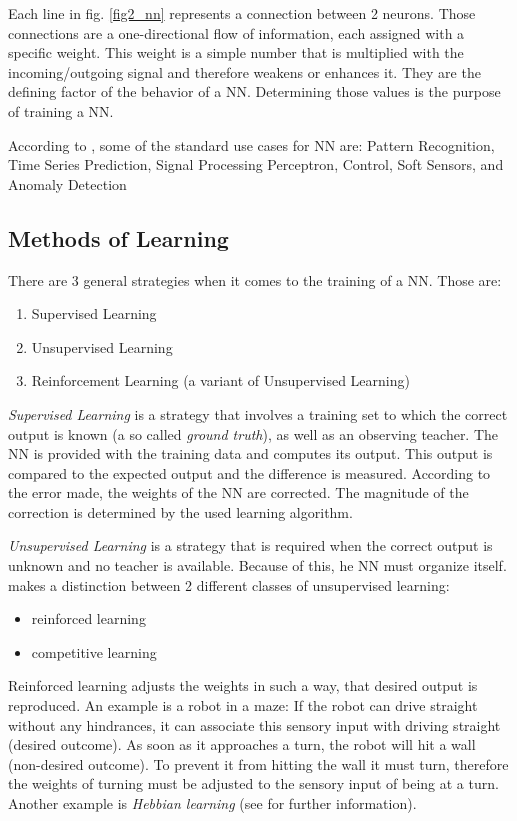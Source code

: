 Each line in fig. \ref{fig2_nn} represents a connection between 2 neurons. Those connections are a one-directional flow of information, each assigned with a specific weight. This weight is a simple number that is multiplied with the incoming/outgoing signal and therefore weakens or enhances it. They are the defining factor of the behavior of a NN. Determining those values is the purpose of training a NN\cite{Bourg04}.

According to \cite{Shiffman12}, some of the standard use cases for NN are: Pattern Recognition, Time Series Prediction, Signal Processing Perceptron, Control, Soft Sensors, and Anomaly Detection

\subsection{Methods of Learning}
\label{sec2_learning}
There are 3 general strategies when it comes to the training of a NN\cite{Bourg04}. Those are:

\begin{enumerate}
	\item Supervised Learning
	\item Unsupervised Learning
	\item Reinforcement Learning (a variant of Unsupervised Learning\cite{Rojas96})
\end{enumerate}

\emph{Supervised Learning} is a strategy that involves a training set to which the correct output is known (a so called \emph{ground truth}), as well as an observing teacher. The NN is provided with the training data and computes its output. This output is compared to the expected output and the difference is measured. According to the error made, the weights of the NN are corrected. The magnitude of the correction is determined by the used learning algorithm\cite{Rojas96}.

\emph{Unsupervised Learning} is a strategy that is required when the correct output is unknown and no teacher is available. Because of this, he NN must organize itself\cite{Shiffman12}. \cite{Rojas96} makes a distinction between 2 different classes of unsupervised learning:

\begin{itemize}
	\item reinforced learning
	\item competitive learning
\end{itemize}

Reinforced learning adjusts the weights in such a way, that desired output is reproduced. An example is a robot in a maze: If the robot can drive straight without any hindrances, it can associate this sensory input with driving straight (desired outcome). As soon as it approaches a turn, the robot will hit a wall (non-desired outcome). To prevent it from hitting the wall it must turn, therefore the weights of turning must be adjusted to the sensory input of being at a turn. Another example is \emph{Hebbian learning} (see \cite{Rojas96} for further information).

